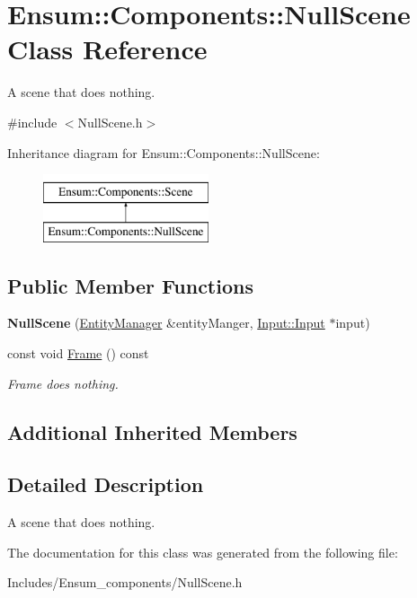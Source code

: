 \hypertarget{class_ensum_1_1_components_1_1_null_scene}{}\section{Ensum\+:\+:Components\+:\+:Null\+Scene Class Reference}
\label{class_ensum_1_1_components_1_1_null_scene}


A scene that does nothing.  




{\ttfamily \#include $<$Null\+Scene.\+h$>$}

Inheritance diagram for Ensum\+:\+:Components\+:\+:Null\+Scene\+:\begin{figure}[H]
\begin{center}
\leavevmode
\includegraphics[height=2.000000cm]{class_ensum_1_1_components_1_1_null_scene}
\end{center}
\end{figure}
\subsection*{Public Member Functions}
\begin{DoxyCompactItemize}
\item 
{\bfseries Null\+Scene} (\hyperlink{class_ensum_1_1_components_1_1_entity_manager}{Entity\+Manager} \&entity\+Manger, \hyperlink{class_ensum_1_1_input_1_1_input}{Input\+::\+Input} $\ast$input)\hypertarget{class_ensum_1_1_components_1_1_null_scene_a140c16207aa1450a50a78bd4030cffb4}{}\label{class_ensum_1_1_components_1_1_null_scene_a140c16207aa1450a50a78bd4030cffb4}

\item 
const void \hyperlink{class_ensum_1_1_components_1_1_null_scene_aa3af0ed7bd0022ed416a9b512e0d2783}{Frame} () const \hypertarget{class_ensum_1_1_components_1_1_null_scene_aa3af0ed7bd0022ed416a9b512e0d2783}{}\label{class_ensum_1_1_components_1_1_null_scene_aa3af0ed7bd0022ed416a9b512e0d2783}

\begin{DoxyCompactList}\small\item\em Frame does nothing. \end{DoxyCompactList}\end{DoxyCompactItemize}
\subsection*{Additional Inherited Members}


\subsection{Detailed Description}
A scene that does nothing. 

The documentation for this class was generated from the following file\+:\begin{DoxyCompactItemize}
\item 
Includes/\+Ensum\+\_\+components/Null\+Scene.\+h\end{DoxyCompactItemize}
